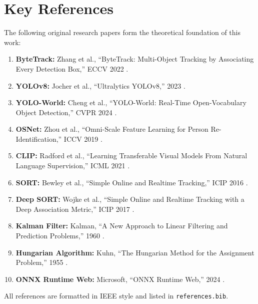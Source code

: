 \section{Key References}
\label{sec:key-refs}

The following original research papers form the theoretical foundation of this work:

\begin{enumerate}
    \item \textbf{ByteTrack:} Zhang et al., ``ByteTrack: Multi-Object Tracking by Associating Every Detection Box,'' ECCV 2022 \cite{zhang2021bytetrack}.
    \item \textbf{YOLOv8:} Jocher et al., ``Ultralytics YOLOv8,'' 2023 \cite{jocher2023ultralytics}.
    \item \textbf{YOLO-World:} Cheng et al., ``YOLO-World: Real-Time Open-Vocabulary Object Detection,'' CVPR 2024 \cite{cheng2024yoloworld}.
    \item \textbf{OSNet:} Zhou et al., ``Omni-Scale Feature Learning for Person Re-Identification,'' ICCV 2019 \cite{zhou2019osnet}.
    \item \textbf{CLIP:} Radford et al., ``Learning Transferable Visual Models From Natural Language Supervision,'' ICML 2021 \cite{radford2021clip}.
    \item \textbf{SORT:} Bewley et al., ``Simple Online and Realtime Tracking,'' ICIP 2016 \cite{bewley2016sort}.
    \item \textbf{Deep SORT:} Wojke et al., ``Simple Online and Realtime Tracking with a Deep Association Metric,'' ICIP 2017 \cite{wojke2017deepsort}.
    \item \textbf{Kalman Filter:} Kalman, ``A New Approach to Linear Filtering and Prediction Problems,'' 1960 \cite{kalman1960new}.
    \item \textbf{Hungarian Algorithm:} Kuhn, ``The Hungarian Method for the Assignment Problem,'' 1955 \cite{kuhn1955hungarian}.
    \item \textbf{ONNX Runtime Web:} Microsoft, ``ONNX Runtime Web,'' 2024 \cite{ortweb}.
\end{enumerate}

All references are formatted in IEEE style and listed in \texttt{references.bib}.